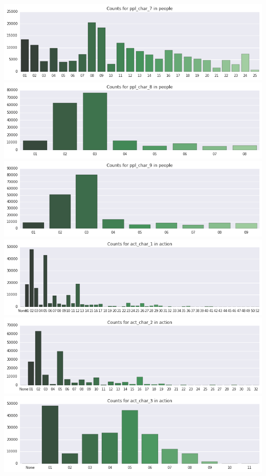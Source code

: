 \documentclass[]{report}
\begin{document}
\includegraphics{BarPlots_files/BarPlots_5_5.png}
\includegraphics{BarPlots_files/BarPlots_5_6.png}
\includegraphics{BarPlots_files/BarPlots_5_7.png}
\includegraphics{BarPlots_files/BarPlots_6_0.png}
\includegraphics{BarPlots_files/BarPlots_6_1.png}
\includegraphics{BarPlots_files/BarPlots_6_2.png}
\end{document}
